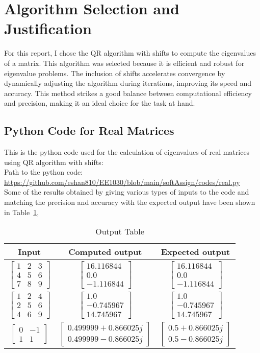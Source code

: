 \documentclass[12pt]{article}
\newcommand{\myvec}[1]{\begin{bmatrix} #1 \end{bmatrix}}
\begin{document}
\section{Algorithm Selection and Justification}
For this report, I chose the QR algorithm with shifts to compute the eigenvalues of a matrix. This algorithm was selected because it is efficient and robust for eigenvalue problems. The inclusion of shifts accelerates convergence by dynamically adjusting the algorithm during iterations, improving its speed and accuracy. This method strikes a good balance between computational efficiency and precision, making it an ideal choice for the task at hand.

\subsection{Python Code for Real Matrices}
This is the python code used for the calculation of eigenvalues of real matrices using QR algorithm with shifts: \\
Path to the python code:\\
\url{https://github.com/eshan810/EE1030/blob/main/softAssign/codes/real.py}\\

Some of the results obtained by giving various types of inputs to the code and matching the precision and accuracy with the expected output have been shown in Table~\ref{Table 1},


\begin{table}[H]
\centering
\begin{tabular}{|c|c|c|}
\hline
\textbf{Input} & \textbf{Computed output} & \textbf{Expected output} \\
\hline
$\myvec{1 &2 &3\\4&5 &6\\7&8&9}$ & $\myvec{16.116844\\ 0.0\\-1.116844}$ & $\myvec{16.116844\\ 0.0\\-1.116844}$ \\ \hline
$\myvec{1&2&4\\2&5&6\\4&6&9}$ & $\myvec{1.0\\ -0.745967\\ 14.745967}$ & $\myvec{1.0\\ -0.745967\\ 14.745967}$ \\ \hline
$\myvec{0&-1\\1&1}$ & $\myvec{0.499999+0.866025j\\0.499999-0.866025j}$ &$\myvec{0.5+0.866025j\\0.5-0.866025j}$\\ \hline
\end{tabular}
\caption{Output Table}
\label{Table 1}
\end{table}
\end{document}
